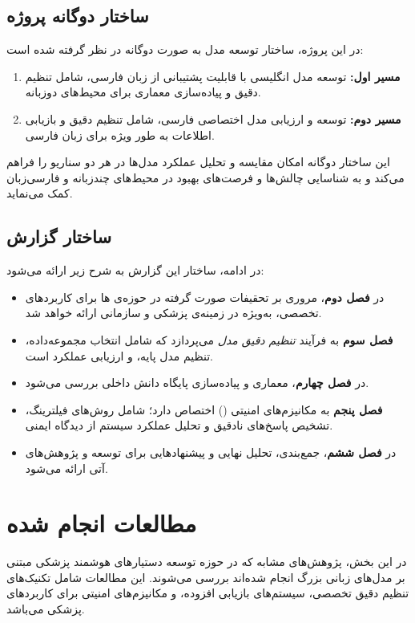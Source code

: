 \documentclass[11pt, a4paper, oneside]{book}
\begin{document}
	\section{ساختار دوگانه پروژه}

	در این پروژه، ساختار توسعه مدل به صورت دوگانه در نظر گرفته شده است:
	\begin{enumerate}
		\item \textbf{مسیر اول:} توسعه مدل انگلیسی با قابلیت پشتیبانی از زبان فارسی، شامل تنظیم دقیق و پیاده‌سازی معماری  برای محیط‌های دوزبانه.
		\item \textbf{مسیر دوم:} توسعه و ارزیابی مدل اختصاصی فارسی، شامل تنظیم دقیق و بازیابی اطلاعات به طور ویژه برای زبان فارسی.
	\end{enumerate}
	این ساختار دوگانه امکان مقایسه و تحلیل عملکرد مدل‌ها در هر دو سناریو را فراهم می‌کند و به شناسایی چالش‌ها و فرصت‌های بهبود در محیط‌های چندزبانه و فارسی‌زبان کمک می‌نماید.


	\section{ساختار گزارش}

	در ادامه، ساختار این گزارش به شرح زیر ارائه می‌شود:
	\begin{itemize}
		\item در \textbf{فصل دوم}، مروری بر تحقیفات صورت گرفته در حوزه‌ی ها برای کاربردهای تخصصی، به‌ویژه در زمینه‌ی پزشکی و سازمانی ارائه خواهد شد.
		\item \textbf{فصل سوم} به فرآیند \textit{تنظیم دقیق مدل} می‌پردازد که شامل انتخاب مجموعه‌داده، تنظیم مدل پایه، و ارزیابی عملکرد است.
		\item در \textbf{فصل چهارم}، معماری \textit{} و پیاده‌سازی پایگاه دانش داخلی بررسی می‌شود.
		\item \textbf{فصل پنجم} به مکانیزم‌های امنیتی () اختصاص دارد؛ شامل روش‌های فیلترینگ، تشخیص پاسخ‌های نادقیق و تحلیل عملکرد سیستم از دیدگاه ایمنی.
		\item در \textbf{فصل ششم}، جمع‌بندی، تحلیل نهایی و پیشنهادهایی برای توسعه و پژوهش‌های آتی ارائه می‌شود.
	\end{itemize}

	
	\chapter{مطالعات انجام شده}

	در این بخش، پژوهش‌های مشابه که در حوزه توسعه دستیارهای هوشمند پزشکی مبتنی بر مدل‌های زبانی بزرگ انجام شده‌اند بررسی می‌شوند. این مطالعات شامل تکنیک‌های تنظیم دقیق تخصصی، سیستم‌های بازیابی افزوده، و مکانیزم‌های امنیتی برای کاربردهای پزشکی می‌باشد.
\end{document}
